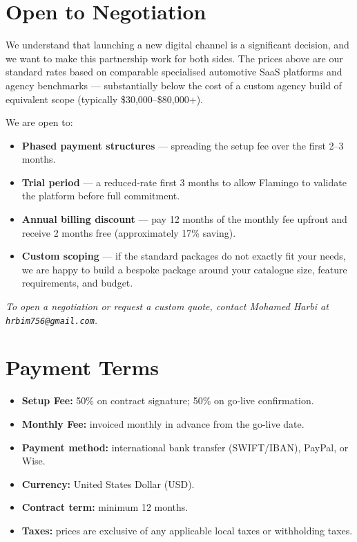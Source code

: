 \documentclass[11pt,a4paper]{article}
\begin{document}
\section*{Open to Negotiation}

We understand that launching a new digital channel is a significant
decision, and we want to make this partnership work for both sides.
The prices above are our standard rates based on comparable
specialised automotive SaaS platforms and agency benchmarks ---
substantially below the cost of a custom agency build of equivalent
scope (typically \$30{,}000--\$80{,}000+).

\medskip
\noindent We are open to:
\begin{itemize}[leftmargin=1.4em,itemsep=3pt]
  \item \textbf{Phased payment structures} --- spreading the setup
        fee over the first 2--3 months.
  \item \textbf{Trial period} --- a reduced-rate first 3 months
        to allow Flamingo to validate the platform before full
        commitment.
  \item \textbf{Annual billing discount} --- pay 12 months of
        the monthly fee upfront and receive 2 months free
        (approximately 17\% saving).
  \item \textbf{Custom scoping} --- if the standard packages do
        not exactly fit your needs, we are happy to build a
        bespoke package around your catalogue size, feature
        requirements, and budget.
\end{itemize}

\medskip
\noindent\textit{To open a negotiation or request a custom quote,
contact Mohamed Harbi at \texttt{hrbim756@gmail.com}.}

\section*{Payment Terms}

\begin{itemize}[leftmargin=1.4em,itemsep=4pt]
  \item \textbf{Setup Fee:} 50\% on contract signature;
        50\% on go-live confirmation.
  \item \textbf{Monthly Fee:} invoiced monthly in advance from
        the go-live date.
  \item \textbf{Payment method:} international bank transfer
        (SWIFT/IBAN), PayPal, or Wise.
  \item \textbf{Currency:} United States Dollar (USD).
  \item \textbf{Contract term:} minimum 12 months.
  \item \textbf{Taxes:} prices are exclusive of any applicable
        local taxes or withholding taxes.
\end{itemize}
\end{document}
